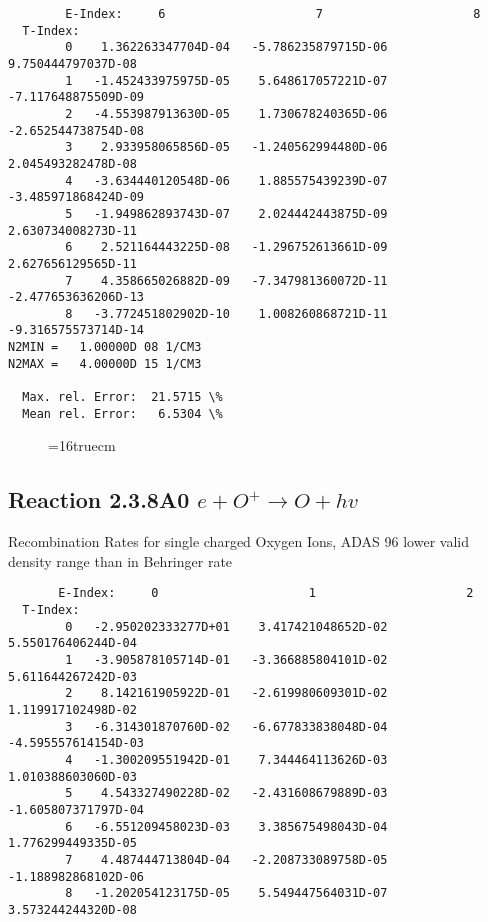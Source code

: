 \documentclass[12pt,dvipdfmx]{article}
\begin{document}
{\begin{small}
\begin{verbatim}
        E-Index:     6                     7                     8
  T-Index:
        0    1.362263347704D-04   -5.786235879715D-06    9.750444797037D-08
        1   -1.452433975975D-05    5.648617057221D-07   -7.117648875509D-09
        2   -4.553987913630D-05    1.730678240365D-06   -2.652544738754D-08
        3    2.933958065856D-05   -1.240562994480D-06    2.045493282478D-08
        4   -3.634440120548D-06    1.885575439239D-07   -3.485971868424D-09
        5   -1.949862893743D-07    2.024442443875D-09    2.630734008273D-11
        6    2.521164443225D-08   -1.296752613661D-09    2.627656129565D-11
        7    4.358665026882D-09   -7.347981360072D-11   -2.477653636206D-13
        8   -3.772451802902D-10    1.008260868721D-11   -9.316575573714D-14
N2MIN =   1.00000D 08 1/CM3
N2MAX =   4.00000D 15 1/CM3

  Max. rel. Error:  21.5715 \%
  Mean rel. Error:   6.5304 \%

\end{verbatim}\end{small}
\begin{figure} \label{2.3.7A0}
\epsfxsize=16truecm 
\end{figure}
\newpage

\subsection{
Reaction 2.3.8A0  $e + O^{+} \rightarrow O + hv$ }
 Recombination Rates for single  charged Oxygen Ions, ADAS 96
 lower valid density range than in Behringer rate

\begin{small}\begin{verbatim}
       E-Index:     0                     1                     2
  T-Index:
        0   -2.950202333277D+01    3.417421048652D-02    5.550176406244D-04
        1   -3.905878105714D-01   -3.366885804101D-02    5.611644267242D-03
        2    8.142161905922D-01   -2.619980609301D-02    1.119917102498D-02
        3   -6.314301870760D-02   -6.677833838048D-04   -4.595557614154D-03
        4   -1.300209551942D-01    7.344464113626D-03    1.010388603060D-03
        5    4.543327490228D-02   -2.431608679889D-03   -1.605807371797D-04
        6   -6.551209458023D-03    3.385675498043D-04    1.776299449335D-05
        7    4.487444713804D-04   -2.208733089758D-05   -1.188982868102D-06
        8   -1.202054123175D-05    5.549447564031D-07    3.573244244320D-08


\end{verbatim}
\end{small}}
\end{document}
